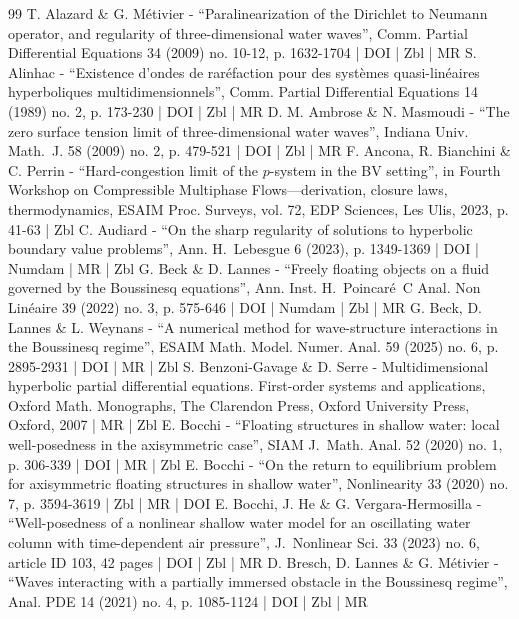 \documentclass[10pt]{amsart}
\theoremstyle{definition}
\begin{document}
\begin{thebibliography}{99}
T. Alazard \& G. Métivier - “Paralinearization of the Dirichlet to Neumann operator, and regularity of three-dimensional water waves”, Comm. Partial Differential Equations 34 (2009) no. 10-12, p. 1632-1704 | DOI | Zbl | MR
S. Alinhac - “Existence d’ondes de raréfaction pour des systèmes quasi-linéaires hyperboliques multidimensionnels”, Comm. Partial Differential Equations 14 (1989) no. 2, p. 173-230 | DOI | Zbl | MR
D. M. Ambrose \& N. Masmoudi - “The zero surface tension limit of three-dimensional water waves”, Indiana Univ. Math. J. 58 (2009) no. 2, p. 479-521 | DOI | Zbl | MR
F. Ancona, R. Bianchini \& C. Perrin - “Hard-congestion limit of the $p$-system in the BV setting”, in Fourth Workshop on Compressible Multiphase Flows—derivation, closure laws, thermodynamics, ESAIM Proc. Surveys, vol. 72, EDP Sciences, Les Ulis, 2023, p. 41-63 | Zbl
C. Audiard - “On the sharp regularity of solutions to hyperbolic boundary value problems”, Ann. H. Lebesgue 6 (2023), p. 1349-1369 | DOI | Numdam | MR | Zbl
G. Beck \& D. Lannes - “Freely floating objects on a fluid governed by the Boussinesq equations”, Ann. Inst. H. Poincaré C Anal. Non Linéaire 39 (2022) no. 3, p. 575-646 | DOI | Numdam | Zbl | MR
G. Beck, D. Lannes \& L. Weynans - “A numerical method for wave-structure interactions in the Boussinesq regime”, ESAIM Math. Model. Numer. Anal. 59 (2025) no. 6, p. 2895-2931 | DOI | MR | Zbl
S. Benzoni-Gavage \& D. Serre - Multidimensional hyperbolic partial differential equations. First-order systems and applications, Oxford Math. Monographs, The Clarendon Press, Oxford University Press, Oxford, 2007 | MR | Zbl
E. Bocchi - “Floating structures in shallow water: local well-posedness in the axisymmetric case”, SIAM J. Math. Anal. 52 (2020) no. 1, p. 306-339 | DOI | MR | Zbl
E. Bocchi - “On the return to equilibrium problem for axisymmetric floating structures in shallow water”, Nonlinearity 33 (2020) no. 7, p. 3594-3619 | Zbl | MR | DOI
E. Bocchi, J. He \& G. Vergara-Hermosilla - “Well-posedness of a nonlinear shallow water model for an oscillating water column with time-dependent air pressure”, J. Nonlinear Sci. 33 (2023) no. 6, article ID 103, 42 pages | DOI | Zbl | MR
D. Bresch, D. Lannes \& G. Métivier - “Waves interacting with a partially immersed obstacle in the Boussinesq regime”, Anal. PDE 14 (2021) no. 4, p. 1085-1124 | DOI | Zbl | MR

\end{thebibliography}
\end{document}
